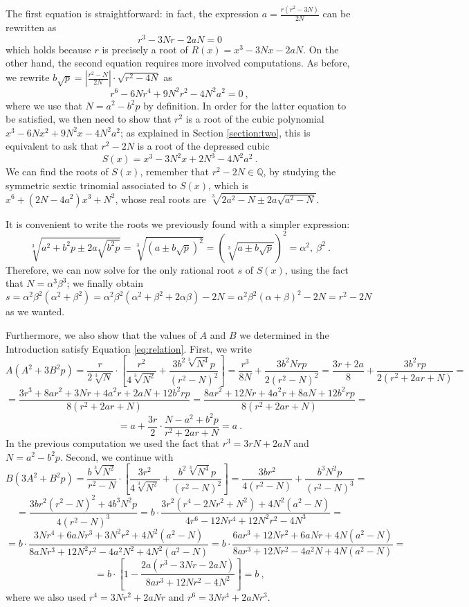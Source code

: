 \documentclass[11pt,a4paper]{article}
\numberwithin{equation}{section}
\newcommand{\Q}{\mathbb{Q}}
\theoremstyle{definition}
\begin{document}
The first equation is straightforward: in fact, the expression $a=\frac{r(r^2-3N)}{2N}$ can be rewritten as \[r^3-3Nr-2aN=0\] which holds because $r$ is precisely a root of $R(x)=x^3-3Nx-2aN$.
On the other hand, the second equation requires more involved computations. As before, we rewrite $b\sqrt p=\left|\frac{r^2-N}{2N}\right|\cdot\sqrt{r^2-4N}$ as \[r^6-6Nr^4+9N^2r^2-4N^2a^2=0\:,\] where we use that $N=a^2-b^2p$ by definition. In order for the latter equation to be satisfied, we then need to show that $r^2$ is a root of the cubic polynomial $x^3-6Nx^2+9N^2x-4N^2a^2$; as explained in Section \ref{section:two}, this is equivalent to ask that $r^2-2N$ is a root of the depressed cubic \[S(x)=x^3-3N^2x+2N^3-4N^2a^2\:.\] We can find the roots of $S(x)$, remember that $r^2-2N\in\Q$, by studying the symmetric sextic trinomial associated to $S(x)$, which is $x^6+(2N-4a^2)x^3+N^2$, whose real roots are $\sqrt[3]{2a^2-N\pm2a\sqrt{a^2-N}}$.

It is convenient to write the roots we previously found with a simpler expression: \[\sqrt[3]{a^2+b^2p\pm2a\sqrt{b^2p}}=\sqrt[3]{(a\pm b\sqrt p)^2}=\left(\sqrt[3]{a\pm b\sqrt p}\right)^2=\alpha^2,\:\beta^2\:.\] Therefore, we can now solve for the only rational root $s$ of $S(x)$, using the fact that $N=\alpha^3\beta^3$; we finally obtain \[s=\alpha^2\beta^2(\alpha^2+\beta^2)=\alpha^2\beta^2(\alpha^2+\beta^2+2\alpha\beta)-2N=\alpha^2\beta^2(\alpha+\beta)^2-2N=r^2-2N\] as we wanted.

Furthermore, we also show that the values of $A$ and $B$ we determined in the Introduction satisfy Equation \eqref{eq:relation}. First, we write \[A(A^2+3B^2p)=\dfrac{r}{2\sqrt[3]{N}}\cdot\left[\dfrac{r^2}{4\sqrt[3]{N^2}}+\dfrac{3b^2\sqrt[3]{N^4}p}{(r^2-N)^2}\right]=\dfrac{r^3}{8N}+\dfrac{3b^2Nrp}{2(r^2-N)^2}=\dfrac{3r+2a}{8}+\dfrac{3b^2rp}{2(r^2+2ar+N)}=\]
\[=\dfrac{3r^3+8ar^2+3Nr+4a^2r+2aN+12b^2rp}{8(r^2+2ar+N)}=\dfrac{8ar^2+12Nr+4a^2r+8aN+12b^2rp}{8(r^2+2ar+N)}=\]
\[=a+\dfrac{3r}{2}\cdot\dfrac{N-a^2+b^2p}{r^2+2ar+N}=a\:.\]
In the previous computation we used the fact that $r^3=3rN+2aN$ and $N=a^2-b^2p$. Second, we continue with \[B(3A^2+B^2p)=\dfrac{b\sqrt[3]{N^2}}{r^2-N}\cdot\left[\dfrac{3r^2}{4\sqrt[3]{N^2}}+\dfrac{b^2\sqrt[3]{N^4}p}{(r^2-N)^2}\right]=\dfrac{3br^2}{4(r^2-N)}+\dfrac{b^3N^2p}{(r^2-N)^3}=\]\[=\dfrac{3br^2(r^2-N)^2+4b^3N^2p}{4(r^2-N)^3}=b\cdot\dfrac{3r^2(r^4-2Nr^2+N^2)+4N^2(a^2-N)}{4r^6-12Nr^4+12N^2r^2-4N^3}=\]
\[=b\cdot\dfrac{3Nr^4+6aNr^3+3N^2r^2+4N^2(a^2-N)}{8aNr^3+12N^2r^2-4a^2N^2+4N^2(a^2-N)}=
b\cdot\dfrac{6ar^3+12Nr^2+6aNr+4N(a^2-N)}{8ar^3+12Nr^2-4a^2N+4N(a^2-N)}=\]
\[=b\cdot\left[1-\dfrac{2a(r^3-3Nr-2aN)}{8ar^3+12Nr^2-4N^2}\right]=b\:,\]
where we also used $r^4=3Nr^2+2aNr$ and $r^6=3Nr^4+2aNr^3$.
\end{document}
